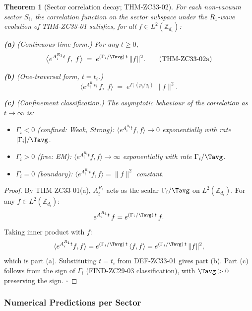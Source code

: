 \documentclass[12pt, a4paper]{article}
\newtheorem{theorem}{Theorem}[section]
\begin{document}
\begin{theorem}[Sector correlation decay; THM-ZC33-02]
\label{thm:zc33-02}
For each non-vacuum sector $S_i$, the correlation function
on the sector subspace under the $R_1$-wave evolution of
THM-ZC33-01 satisfies, for all $f\in L^2(\mathbb{Z}_{d_i})$:

\textbf{(a)} (Continuous-time form.) For any $t\geq 0$,
\begin{equation}
  \bigl\langle e^{A_i^{R_1} t}\,f,\; f\bigr\rangle
    \;=\; e^{(\Gamma_i/\Tavg)\,t}\,\|f\|^2.
  \tag{THM-ZC33-02a}\label{eq:thm-zc33-02a}
\end{equation}

\textbf{(b)} (One-traversal form, $t = t_i$.)
\begin{equation}
  \bigl\langle e^{A_i^{R_1} t_i}\,f,\; f\bigr\rangle
    \;=\; e^{\Gamma_i\,(p_i/q_i)}\,\|f\|^2.
  \tag{THM-ZC33-02b}\label{eq:thm-zc33-02b}
\end{equation}

\textbf{(c)} (Confinement classification.) The asymptotic
behaviour of the correlation as $t\to\infty$ is:
\begin{itemize}[leftmargin=*, noitemsep]
\item $\Gamma_i < 0$ (confined: Weak, Strong):
  $\langle e^{A_i^{R_1} t}f, f\rangle \to 0$ exponentially
  with rate $|\Gamma_i|/\Tavg$.
\item $\Gamma_i > 0$ (free: EM):
  $\langle e^{A_i^{R_1} t}f, f\rangle \to \infty$
  exponentially with rate $\Gamma_i/\Tavg$.
\item $\Gamma_i = 0$ (boundary):
  $\langle e^{A_i^{R_1} t}f, f\rangle = \|f\|^2$ constant.
\end{itemize}
\end{theorem}

\begin{proof}
By THM-ZC33-01(a), $A_i^{R_1}$ acts as the scalar
$\Gamma_i/\Tavg$ on $L^2(\mathbb{Z}_{d_i})$. For any
$f\in L^2(\mathbb{Z}_{d_i})$:
\[
  e^{A_i^{R_1} t}\,f = e^{(\Gamma_i/\Tavg)\,t}\,f.
\]
Taking inner product with $f$:
\[
  \langle e^{A_i^{R_1} t}f, f\rangle
    = e^{(\Gamma_i/\Tavg)\,t}\,\langle f, f\rangle
    = e^{(\Gamma_i/\Tavg)\,t}\,\|f\|^2,
\]
which is part (a). Substituting $t = t_i$ from DEF-ZC33-01
gives part (b). Part (c) follows from the sign of $\Gamma_i$
(FIND-ZC29-03 classification), with $\Tavg > 0$ preserving
the sign.
\hfill$\square$
\end{proof}

\subsubsection{Numerical Predictions per Sector}
\end{document}
